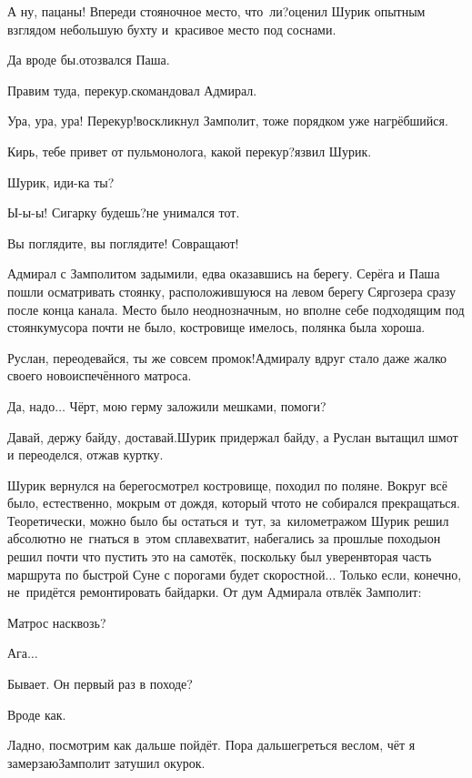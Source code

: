 \diagdash А ну, пацаны! Впереди стояночное место, что~ли?\mdash оценил Шурик опытным взглядом небольшую бухту и~красивое место под соснами.

\diagdash Да вроде бы.\mdash отозвался Паша.

\diagdash Правим туда, перекур.\mdash скомандовал Адмирал. 

\diagdash Ура, ура, ура! Перекур!\mdash воскликнул Замполит, тоже порядком уже нагрёбшийся.

\diagdash Кирь, тебе привет от пульмонолога, какой перекур?\mdash язвил Шурик.

\diagdash Шурик, иди-ка ты?

\diagdash Ы-ы-ы! Сигарку будешь?\mdash не унимался тот.

\diagdash Вы поглядите, вы поглядите! Совращают!

Адмирал с Замполитом задымили, едва оказавшись на берегу. Серёга и Паша пошли осматривать стоянку, расположившуюся на левом берегу Сяргозера сразу после конца канала. Место было неоднозначным, но вполне себе подходящим под стоянку\mdash мусора почти не было, костровище имелось, полянка была хороша. 

\diagdash Руслан, переодевайся, ты же совсем промок!\mdash Адмиралу вдруг стало даже жалко своего новоиспечённого матроса. 

\diagdash Да, надо$\ldots$ Чёрт, мою герму заложили мешками, помоги?

\diagdash Давай, держу байду, доставай.\mdash Шурик придержал байду, а Руслан вытащил шмот и переоделся, отжав куртку. 

Шурик вернулся на берег\mdash осмотрел костровище, походил по поляне. Вокруг всё было, естественно, мокрым от дождя, который что\sdash то не собирался прекращаться. Теоретически, можно было бы остаться и~тут, за~километражом Шурик решил абсолютно не~гнаться в~этом сплаве\mdash хватит, набегались за прошлые походы\mdash он решил почти что пустить это на самотёк, поскольку был уверен\mdash вторая часть маршрута по быстрой Суне с порогами будет скоростной$\ldots$ Только если, конечно, не~придётся ремонтировать байдарки. От дум Адмирала отвлёк Замполит:

\diagdash Матрос насквозь?

\diagdash Ага$\ldots$

\diagdash Бывает. Он первый раз в походе?

\diagdash Вроде как.

\diagdash Ладно, посмотрим как дальше пойдёт. Пора дальше\mdash греться веслом, чёт я замерзаю\mdash Замполит затушил окурок.

